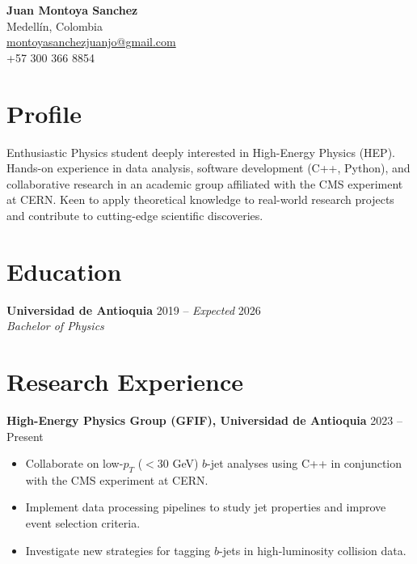 \documentclass[a4paper,11pt]{article}
\begin{document}
\begin{center}
    {\LARGE \textbf{Juan Montoya Sanchez}} \\
    \vspace{1mm}
    Medellín, Colombia \\
    \href{mailto:montoyasanchezjuanjo@gmail.com}{montoyasanchezjuanjo@gmail.com} \\
    +57 300 366 8854
\end{center}

\section*{Profile}
Enthusiastic Physics student deeply interested in High-Energy Physics (HEP). 
Hands-on experience in data analysis, software development (C++, Python), 
and collaborative research in an academic group affiliated with the CMS experiment at CERN. 
Keen to apply theoretical knowledge to real-world research projects 
and contribute to cutting-edge scientific discoveries.

\section*{Education}
\textbf{Universidad de Antioquia} \hfill 2019 -- \textit{Expected} 2026 \\
\textit{Bachelor of Physics}%

\section*{Research Experience}
\textbf{High-Energy Physics Group (GFIF), Universidad de Antioquia} \hfill 2023 -- Present 
\begin{itemize}
    \item Collaborate on low-$p_T$ ($<30$ GeV) $b$-jet analyses using C++ in conjunction with the CMS experiment at CERN.
    \item Implement data processing pipelines to study jet properties and improve event selection criteria.
    \item Investigate new strategies for tagging $b$-jets in high-luminosity collision data.
\end{itemize}
\end{document}
